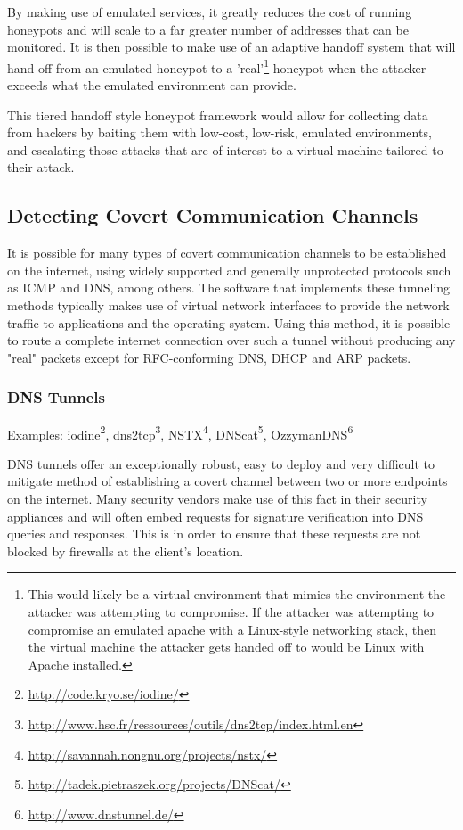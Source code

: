 \documentclass{article}
\newcommand{\hreff}[2]{\href{#1}{#2}\footnote{\url{#1}}}
\theoremstyle{remark}
\theoremstyle{definition}
\theoremstyle{definition}
\theoremstyle{definition}
\begin{document}
By making use of emulated services, it greatly reduces the cost of running honeypots and will scale to a far greater number of addresses that can be monitored. It is then possible to make use of an adaptive handoff system that will hand off from an emulated honeypot to a 'real'\footnote{This would likely be a virtual environment that mimics the environment the attacker was attempting to compromise. If the attacker was attempting to compromise an emulated apache with a Linux-style networking stack, then the virtual machine the attacker gets handed off to would be Linux with Apache installed.} honeypot when the attacker exceeds what the emulated environment can provide.

This tiered handoff style honeypot framework would allow for collecting data from hackers by baiting them with low-cost, low-risk, emulated environments, and escalating those attacks that are of interest to a virtual machine tailored to their attack.

\subsection{Detecting Covert Communication Channels}
\label{covert-channels}
It is possible for many types of covert communication channels to be established on the internet, using widely supported and generally unprotected protocols such as ICMP and DNS, among others. The software that implements these tunneling methods typically makes use of virtual network interfaces to provide the network traffic to applications and the operating system. Using this method, it is possible to route a complete internet connection over such a tunnel without producing any "real" packets except for RFC-conforming DNS, DHCP and ARP packets.

\subsubsection{DNS Tunnels}
\label{dns-tunnels}
Examples: \hreff{http://code.kryo.se/iodine/}{iodine}, \hreff{http://www.hsc.fr/ressources/outils/dns2tcp/index.html.en}{dns2tcp}, \hreff{http://savannah.nongnu.org/projects/nstx/}{NSTX}, \hreff{http://tadek.pietraszek.org/projects/DNScat/}{DNScat}, \hreff{http://www.dnstunnel.de/}{OzzymanDNS}

DNS tunnels offer an exceptionally robust, easy to deploy and very difficult to mitigate method of establishing a covert channel between two or more endpoints on the internet. Many security vendors make use of this fact in their security appliances and will often embed requests for signature verification into DNS queries and responses. This is in order to ensure that these requests are not blocked by firewalls at the client's location.
\end{document}
